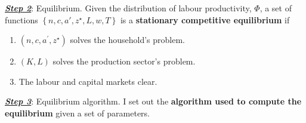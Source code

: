 \colorbox{BurntOrange!25}{\textbf{\textit{\underline{Step 2}}}: Equilibrium.}
Given the distribution of labour productivity, $\Phi$, a set of functions $\left\{n,c,a',z^\star,L,w,T \right\}$ is a \textcolor{BurntOrange}{\textbf{stationary competitive equilibrium}} if
\begin{enumerate}
    \item $\left(n,c,a^\prime, z^\star \right)$ solves the household's problem.
    \item $(K,L)$ solves the production sector's problem. 
    \item The labour and capital markets clear. 
\end{enumerate}  

\colorbox{BurntOrange!25}{\textbf{\textit{\underline{Step 3}}}: Equilibrium algorithm.}
I set out the \textcolor{BurntOrange}{\textbf{algorithm used to compute the equilibrium}} given a set of parameters. 

